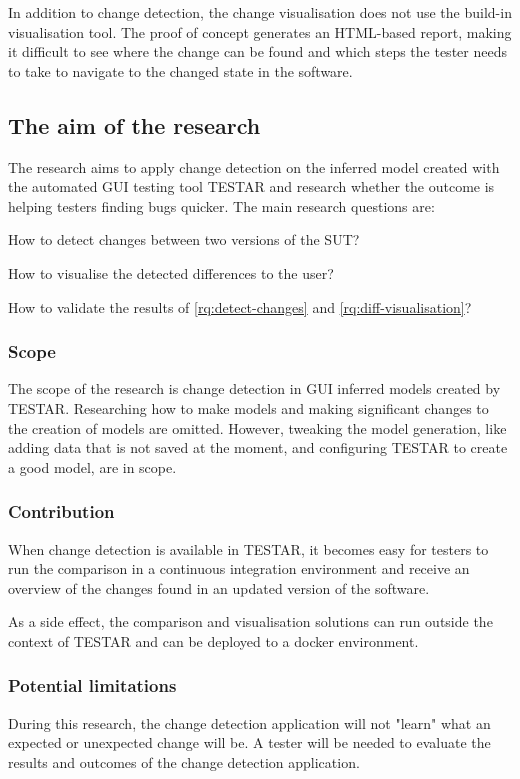 In addition to change detection, the change visualisation does not use the build-in visualisation tool. The proof of concept generates an HTML-based report, making it difficult to see where the change can be found and which steps the tester needs to take to navigate to the changed state in the software.

\subsection{The aim of the research}
The research aims to apply change detection on the inferred model created with the automated GUI testing tool TESTAR and research whether the outcome is helping testers finding bugs quicker. The main research questions are:

\begin{questions}
    \item How to detect changes between two versions of the SUT?
	\item How to visualise the detected differences to the user? 
\item How to validate the results of \ref{rq:detect-changes} and \ref{rq:diff-visualisation}?
\end{questions}

\subsubsection{Scope}
The scope of the research is change detection in GUI inferred models created by TESTAR. Researching how to make models and making significant changes to the creation of models are omitted. However, tweaking the model generation, like adding data that is not saved at the moment, and configuring TESTAR to create a good model, are in scope.

\subsubsection{Contribution}
When change detection is available in TESTAR, it becomes easy for testers to run the comparison in a continuous integration environment and receive an overview of the changes found in an updated version of the software.

As a side effect, the comparison and visualisation solutions can run outside the context of TESTAR and can be deployed to a docker environment.

\subsubsection{Potential limitations}
During this research, the change detection application will not "learn" what an expected or unexpected change will be. A tester will be needed to evaluate the results and outcomes of the change detection application.

